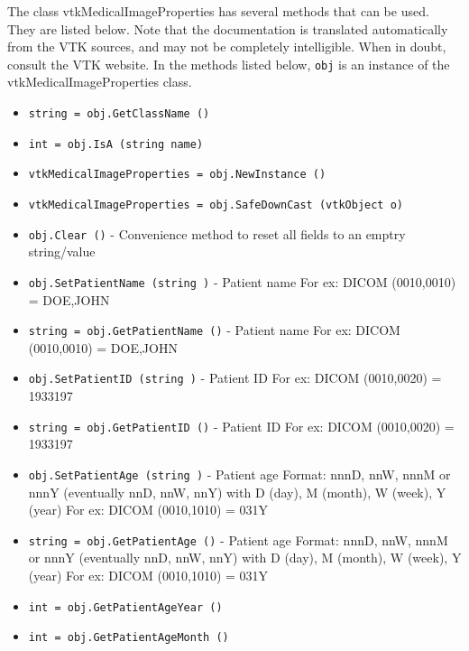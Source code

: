 The class vtkMedicalImageProperties has several methods that can be used.
  They are listed below.
Note that the documentation is translated automatically from the VTK sources,
and may not be completely intelligible.  When in doubt, consult the VTK website.
In the methods listed below, \verb|obj| is an instance of the vtkMedicalImageProperties class.
\begin{itemize}
\item  \verb|string = obj.GetClassName ()|

\item  \verb|int = obj.IsA (string name)|

\item  \verb|vtkMedicalImageProperties = obj.NewInstance ()|

\item  \verb|vtkMedicalImageProperties = obj.SafeDownCast (vtkObject o)|

\item  \verb|obj.Clear ()| -  Convenience method to reset all fields to an emptry string/value

\item  \verb|obj.SetPatientName (string )| -  Patient name
 For ex: DICOM (0010,0010) = DOE,JOHN

\item  \verb|string = obj.GetPatientName ()| -  Patient name
 For ex: DICOM (0010,0010) = DOE,JOHN

\item  \verb|obj.SetPatientID (string )| -  Patient ID
 For ex: DICOM (0010,0020) = 1933197

\item  \verb|string = obj.GetPatientID ()| -  Patient ID
 For ex: DICOM (0010,0020) = 1933197

\item  \verb|obj.SetPatientAge (string )| -  Patient age
 Format: nnnD, nnW, nnnM or nnnY (eventually nnD, nnW, nnY)
         with D (day), M (month), W (week), Y (year)
 For ex: DICOM (0010,1010) = 031Y

\item  \verb|string = obj.GetPatientAge ()| -  Patient age
 Format: nnnD, nnW, nnnM or nnnY (eventually nnD, nnW, nnY)
         with D (day), M (month), W (week), Y (year)
 For ex: DICOM (0010,1010) = 031Y

\item  \verb|int = obj.GetPatientAgeYear ()|

\item  \verb|int = obj.GetPatientAgeMonth ()|


\end{itemize}
